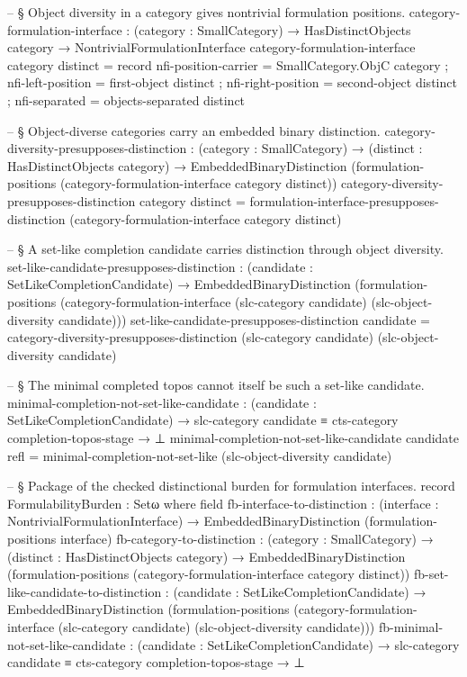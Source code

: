 \documentclass[11pt]{article}
\begin{document}
\begin{code}
-- § Object diversity in a category gives nontrivial formulation positions.
category-formulation-interface :
  (category : SmallCategory) →
  HasDistinctObjects category → NontrivialFormulationInterface
category-formulation-interface category distinct = record
  { nfi-position-carrier = SmallCategory.ObjC category
  ; nfi-left-position    = first-object distinct
  ; nfi-right-position   = second-object distinct
  ; nfi-separated        = objects-separated distinct
  }

-- § Object-diverse categories carry an embedded binary distinction.
category-diversity-presupposes-distinction :
  (category : SmallCategory) →
  (distinct : HasDistinctObjects category) →
  EmbeddedBinaryDistinction
    (formulation-positions (category-formulation-interface category distinct))
category-diversity-presupposes-distinction category distinct =
  formulation-interface-presupposes-distinction
    (category-formulation-interface category distinct)

-- § A set-like completion candidate carries distinction through object diversity.
set-like-candidate-presupposes-distinction :
  (candidate : SetLikeCompletionCandidate) →
  EmbeddedBinaryDistinction
    (formulation-positions
      (category-formulation-interface
        (slc-category candidate)
        (slc-object-diversity candidate)))
set-like-candidate-presupposes-distinction candidate =
  category-diversity-presupposes-distinction
    (slc-category candidate)
    (slc-object-diversity candidate)

-- § The minimal completed topos cannot itself be such a set-like candidate.
minimal-completion-not-set-like-candidate :
  (candidate : SetLikeCompletionCandidate) →
  slc-category candidate ≡ cts-category completion-topos-stage → ⊥
minimal-completion-not-set-like-candidate candidate refl =
  minimal-completion-not-set-like (slc-object-diversity candidate)

-- § Package of the checked distinctional burden for formulation interfaces.
record FormulabilityBurden : Setω where
  field
    fb-interface-to-distinction :
      (interface : NontrivialFormulationInterface) →
      EmbeddedBinaryDistinction (formulation-positions interface)
    fb-category-to-distinction :
      (category : SmallCategory) →
      (distinct : HasDistinctObjects category) →
      EmbeddedBinaryDistinction
        (formulation-positions (category-formulation-interface category distinct))
    fb-set-like-candidate-to-distinction :
      (candidate : SetLikeCompletionCandidate) →
      EmbeddedBinaryDistinction
        (formulation-positions
          (category-formulation-interface
            (slc-category candidate)
            (slc-object-diversity candidate)))
    fb-minimal-not-set-like-candidate :
      (candidate : SetLikeCompletionCandidate) →
      slc-category candidate ≡ cts-category completion-topos-stage → ⊥


\end{code}
\end{document}

